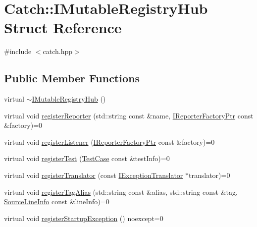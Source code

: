 \hypertarget{structCatch_1_1IMutableRegistryHub}{}\section{Catch\+:\+:I\+Mutable\+Registry\+Hub Struct Reference}
\label{structCatch_1_1IMutableRegistryHub}


{\ttfamily \#include $<$catch.\+hpp$>$}

\subsection*{Public Member Functions}
\begin{DoxyCompactItemize}
\item 
virtual \mbox{\hyperlink{structCatch_1_1IMutableRegistryHub_a759ca1e044e19f905fb4d306f1367193}{$\sim$\+I\+Mutable\+Registry\+Hub}} ()
\item 
virtual void \mbox{\hyperlink{structCatch_1_1IMutableRegistryHub_a1c0ac202ac31ee9f88e8ff5cbac4b243}{register\+Reporter}} (std\+::string const \&name, \mbox{\hyperlink{namespaceCatch_ad1b36ac40c2739e52fd453dcdddf0d09}{I\+Reporter\+Factory\+Ptr}} const \&factory)=0
\item 
virtual void \mbox{\hyperlink{structCatch_1_1IMutableRegistryHub_abd892a133f85581fd00ee75bb379ca56}{register\+Listener}} (\mbox{\hyperlink{namespaceCatch_ad1b36ac40c2739e52fd453dcdddf0d09}{I\+Reporter\+Factory\+Ptr}} const \&factory)=0
\item 
virtual void \mbox{\hyperlink{structCatch_1_1IMutableRegistryHub_a11b85c6744d88c9f83fe16ad4a8dd451}{register\+Test}} (\mbox{\hyperlink{classCatch_1_1TestCase}{Test\+Case}} const \&test\+Info)=0
\item 
virtual void \mbox{\hyperlink{structCatch_1_1IMutableRegistryHub_ae6825365102693cf7707db022a2c2b49}{register\+Translator}} (const \mbox{\hyperlink{structCatch_1_1IExceptionTranslator}{I\+Exception\+Translator}} $\ast$translator)=0
\item 
virtual void \mbox{\hyperlink{structCatch_1_1IMutableRegistryHub_abf2e386b6f94f615719ada711adbf822}{register\+Tag\+Alias}} (std\+::string const \&alias, std\+::string const \&tag, \mbox{\hyperlink{structCatch_1_1SourceLineInfo}{Source\+Line\+Info}} const \&line\+Info)=0
\item 
virtual void \mbox{\hyperlink{structCatch_1_1IMutableRegistryHub_a72a7d5386851ac3200f8da794a009c86}{register\+Startup\+Exception}} () noexcept=0
\end{DoxyCompactItemize}


